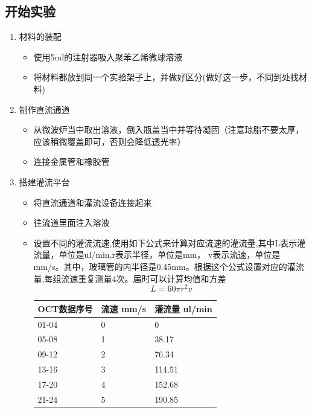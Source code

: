 \documentclass[12pt]{article}
\begin{document}
\subsection{开始实验}
\begin{enumerate}
    \item 材料的装配
    \begin{itemize}
   
    \item 使用5ml的注射器吸入聚苯乙烯微球溶液
    \item 将材料都放到同一个实验架子上，并做好区分(做好这一步，不同到处找材料)
    
    \end{itemize}

    \item 制作直流通道
    \begin{itemize}
        \item 从微波炉当中取出溶液，倒入瓶盖当中并等待凝固（注意琼脂不要太厚，应该稍微覆盖即可，否则会降低透光率）
        \item 连接金属管和橡胶管
    \end{itemize}

    \item 搭建灌流平台
    \begin{itemize}
        
        \item 将直流通道和灌流设备连接起来
        \item 往流道里面注入溶液
        \item 设置不同的灌流流速,使用如下公式来计算对应流速的灌流量,其中L表示灌流量，单位是ul/min,r表示半径，单位是mm，
        v表示流速，单位是mm/s。其中，玻璃管的内半径是0.45mm。根据这个公式设置对应的灌流量,每组流速重复测量4次。届时可以计算均值和方差
        \begin{equation}
            L=60 \pi r^2 v
        \end{equation}

       \footnotesize
       \begin{longtable}{@{} p{5cm} p{5cm} p{5cm} @{}}
           \toprule
           \textbf{OCT数据序号} & \textbf{流速 mm/s} & \textbf{灌流量 ul/min} \\ 
           \midrule
           01-04 & 0 & 0 \\
           05-08 & 1 & 38.17 \\
           09-12 & 2 & 76.34 \\
           13-16 & 3 & 114.51 \\
           17-20 & 4 & 152.68 \\
           21-24 & 5 & 190.85 \\
           

\end{longtable}
\end{itemize}
\end{enumerate}
\end{document}
